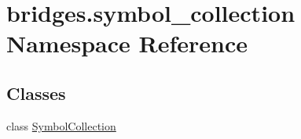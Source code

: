 \hypertarget{namespacebridges_1_1symbol__collection}{}\section{bridges.\+symbol\+\_\+collection Namespace Reference}
\label{namespacebridges_1_1symbol__collection}
\subsection*{Classes}
\begin{DoxyCompactItemize}
\item 
class \mbox{\hyperlink{classbridges_1_1symbol__collection_1_1_symbol_collection}{Symbol\+Collection}}
\end{DoxyCompactItemize}

